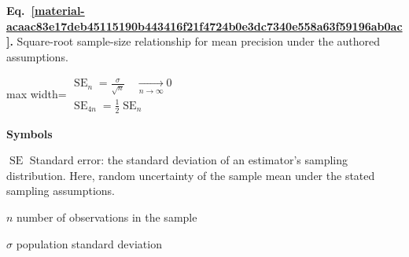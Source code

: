 \documentclass[11pt,a4paper]{article}
\begin{document}
\par\medskip
\begin{samepage}
\label{material-acaac83e17deb45115190b443416f21f4724b0e3dc7340e558a63f59196ab0ac}
\noindent\textbf{Eq.~\ref*{material-acaac83e17deb45115190b443416f21f4724b0e3dc7340e558a63f59196ab0ac}.} Square-root sample-size relationship for mean precision under the authored assumptions.\par\nopagebreak
\begin{center}\begin{adjustbox}{max width=\linewidth}$\displaystyle \begin{gathered}\operatorname{SE}_n=\frac{\sigma}{\sqrt n}\quad\xrightarrow[n\to\infty]{}0\\\operatorname{SE}_{4n}=\frac12\operatorname{SE}_n\end{gathered}$\end{adjustbox}\end{center}

\par\noindent\textbf{Symbols}

\par\noindent\textbf{\(\operatorname{SE}\)} Standard error: the standard deviation of an estimator's sampling distribution. Here, random uncertainty of the sample mean under the stated sampling assumptions.

\par\noindent\textbf{\(n\)} number of observations in the sample

\par\noindent\textbf{\(σ\)} population standard deviation

\end{samepage}
\medskip
\end{document}
